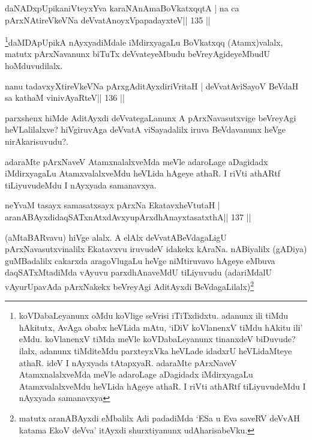 \begin{shl}
daNADxpUpikaniVteyxYva karaNAnAmaBoVkatxqqtA |
na ca pArxNAtireVkeVNa deVvatA\s noyxVpapadayxteV\hfill || 135 ||
\end{shl}

\begin{artha}
\footnote{koVDabaLeyanunx oMdu koVlige seVrisi iTiTxdidxtu. adanunx ili  tiMdu hAkitutx, AvAga obabx heVLida mAtu, `iDiV koVlanenxV tiMdu hAkitu  ili' eMdu. koVlanenxV tiMda meVle koVDabaLeyanunx tinanxdeV biDuvude?  ilalx, adanunx tiMditeMdu parxteyxVka heVLade idadxrU heVLidaMteye athaR. ideV I nAyxyada tAtapxyaR. adaraMte pArxNaveV AtamxnalalxveMda meVle adaroLage aDagidadx  iMdirxyagaLu AtamxvalalxveMdu heVLida hAgeye athaR. I riVti athARtf tiLiyuvudeMdu I nAyxyada samanavxya}daMDApUpikA nAyxyadiMdale iMdirxyagaLu BoVkatxqq (Atamx)valalx, matutx pArxNavanunx biTuTx deVvateyeMbudu beVreyAgideyeMbudU hoMduvudilalx.
\end{artha}


\begin{shl}
nanu tadavxyXtireVkeVNa pArxgAditAyxdiriVritaH |
deVvatAviSayoV BeVdaH sa kathaM vinivAyaRteV\hfill || 136 ||
\end{shl}

\begin{artha}
parxshenx \ndash  hiMde AditAyxdi deVvategaLanunx A pArxNavasutxvige beVreyAgi heVLalilalxve? hiVgiruvAga deVvatA viSayadalilx iruva BeVdavanunx heVge nirAkarisuvudu?.

adaraMte pArxNaveV AtamxnalalxveMda meVle adaroLage aDagidadx iMdirxyagaLu AtamxvalalxveMdu heVLida hAgeye athaR. I riVti athARtf tiLiyuvudeMdu I nAyxyada samanavxya. 
\end{artha}





\begin{shl}
neYvaM tasayx samasatxsayx pArxNa EkatavxheVtutaH |
aranABAyxdidaqSATxnAtxdAvxyupArxdhAnayxtasatxthA\hfill || 137 ||
\end{shl}

\begin{artha}
(aMtaBARvavu) hiVge alalx. A elAlx deVvatABeVdagaLigU 
pArxNavasutxvinalilx Ekatavxvu iruvudeV idakekx kAraNa. nABiyalilx 
(gADiya) guMBadalilx cakarxda aragoVlugaLu heVge niMtiruvavo hAgeye 
eMbuva daqSATxMtadiMda vAyuvu parxdhAnaveMdU tiLiyuvudu (adariMdalU 
vAyurUpavAda pArxNakekx beVreyAgi AditAyxdi 
BeVdagaLilalx)\footnote{matutx aranABAyxdi eMbalilx Adi padadiMda `ESa 
u Eva saveRV deVvAH katama EkoV deVva' itAyxdi shurxtiyanunx udAharisabeVku.}
\end{artha}

